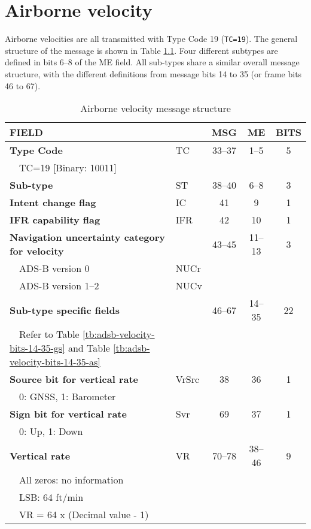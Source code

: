 \chapter{Airborne velocity}

Airborne velocities are all transmitted with Type Code 19 (\texttt{TC=19}). The general structure of the message is shown in Table \ref{tb:adsb-velocity-bits}. Four different subtypes are defined in bits 6--8 of the ME field. All sub-types share a similar overall message structure, with the different definitions from message bits 14 to 35 (or frame bits 46 to 67). 

\begin{table}[ht]
\caption{Airborne velocity message structure}
\label{tb:adsb-velocity-bits}
\footnotesize
\begin{tabular}{|l|l|c|c|c|}
\hline
\textbf{FIELD} & & \textbf{MSG} & \textbf{ME} & \textbf{BITS} \\ \hline
\hline
\textbf{Type Code} & TC & 33--37 & 1--5 & 5\\
~~TC=19 {[}Binary: 10011{]} &&&& \\ \hline
\textbf{Sub-type} & ST & 38--40 & 6--8 & 3\\
\hline
\textbf{Intent change flag} & IC & 41 & 9 & 1 \\ \hline
\textbf{IFR capability flag} & IFR & 42 & 10 & 1 \\ \hline
\textbf{Navigation uncertainty category for velocity} & & 43--45 & 11--13 & 3\\
~~ADS-B version 0 & NUCr &&&\\
~~ADS-B version 1--2 & NUCv &&&\\ \hline
\hline
\textbf{Sub-type specific fields} & & 46--67 & 14--35 & 22\\
~~Refer to Table \ref{tb:adsb-velocity-bits-14-35-gs} and Table \ref{tb:adsb-velocity-bits-14-35-as} &&&& \\ \hline
\hline
\textbf{Source bit for vertical rate} & VrSrc & 38 & 36 & 1 \\
~~0: GNSS, 1: Barometer &&&&\\ \hline
\textbf{Sign bit for vertical rate}  & Svr & 69 & 37 & 1 \\
~~0: Up, 1: Down &&&& \\ \hline
\textbf{Vertical rate} & VR & 70--78 & 38--46 & 9\\
~~All zeros: no information &&&&\\
~~LSB: 64 ft/min &&&&\\
~~VR = 64 x (Decimal value - 1) &&&& \\ \hline

\end{tabular}
\end{table}
